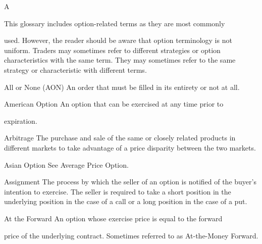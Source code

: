 \noindent A\par
This glossary includes option-related terms as they are most commonly\par
used. However, the reader should be aware that option terminology is not uniform. Traders may sometimes refer to different strategies or option characteristics with the same term. They may sometimes refer to the same strategy or characteristic with different terms.\par
All or None (AON) An order that must be filled in its entirety or not at all.\par
American Option An option that can be exercised at any time prior to\par
expiration.\par
Arbitrage The purchase and sale of the same or closely related products in different markets to take advantage of a price disparity between the two markets.\par
Asian Option See Average Price Option.\par
Assignment The process by which the seller of an option is notified of the buyer's intention to exercise. The seller is required to take a short position in the underlying position in the case of a call or a long position in the case of a put.\par
At the Forward An option whose exercise price is equal to the forward\par
price of the underlying contract. Sometimes referred to as At-the-Money Forward.\par

